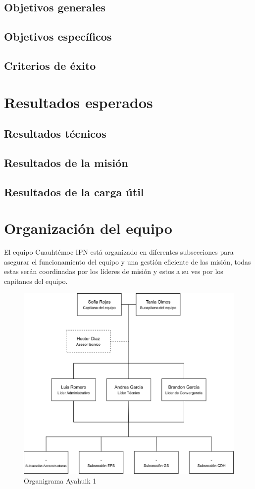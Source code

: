 \documentclass[letterpaper,12pt]{article} %
\begin{document}
    \subsection{Objetivos generales}

    \subsection{Objetivos específicos}
    
    \subsection{Criterios de éxito}

\section{Resultados esperados}

    \subsection{Resultados técnicos}

    \subsection{Resultados de la misión}

    \subsection{Resultados de la carga útil}
\newpage

\section{Organización del equipo}

    El equipo Cuauhtémoc IPN está organizado en diferentes subsecciones para asegurar el funcionamiento del equipo y una gestión 
    eficiente de las misión, todas estas serán coordinadas por los líderes de misión 
    y estos a su ves por los capitanes del equipo. 
    \begin{figure}[!h]
      \centerline{\includegraphics[width=.5\textwidth]{ORG-AYA1-GM-V3.png}}
      \caption{Organigrama Ayahuik 1}
      \label{1}
    \end{figure}
    
\end{document}
